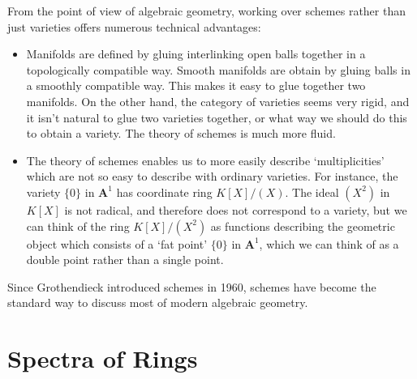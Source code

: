 From the point of view of algebraic geometry, working over schemes rather than just varieties offers numerous technical advantages:
%
\begin{itemize}
    \item Manifolds are defined by gluing interlinking open balls together in a topologically compatible way. Smooth manifolds are obtain by gluing balls in a smoothly compatible way. This makes it easy to glue together two manifolds. On the other hand, the category of varieties seems very rigid, and it isn't natural to glue two varieties together, or what way we should do this to obtain a variety. The theory of schemes is much more fluid.

    \item The theory of schemes enables us to more easily describe `multiplicities' which are not so easy to describe with ordinary varieties. For instance, the variety $\{ 0 \}$ in $\mathbf{A}^1$ has coordinate ring $K[X]/(X)$. The ideal $(X^2)$ in $K[X]$ is not radical, and therefore does not correspond to a variety, but we can think of the ring $K[X]/(X^2)$ as functions describing the geometric object which consists of a `fat point' $\{ 0 \}$ in $\mathbf{A}^1$, which we can think of as a double point rather than a single point.
\end{itemize}
%
Since Grothendieck introduced schemes in 1960, schemes have become the standard way to discuss most of modern algebraic geometry.

\section{Spectra of Rings}

